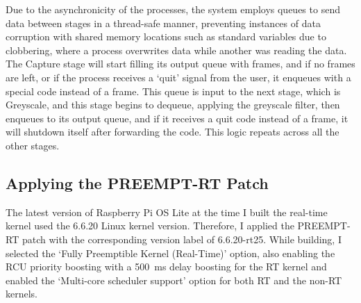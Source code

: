 Due to the asynchronicity of the processes, the system employs queues to send data between stages in a thread-safe manner, preventing instances of data corruption with shared memory locations such as standard variables due to clobbering, where a process overwrites data while another was reading the data. The Capture stage will start filling its output queue with frames, and if no frames are left, or if the process receives a `quit' signal from the user, it enqueues with a special code instead of a frame. This queue is input to the next stage, which is Greyscale, and this stage begins to dequeue, applying the greyscale filter, then enqueues to its output queue, and if it receives a quit code instead of a frame, it will shutdown itself after forwarding the code. This logic repeats across all the other stages.

\subsection{Applying the PREEMPT-RT Patch}

The latest version of Raspberry Pi OS Lite at the time I built the real-time kernel used the 6.6.20 Linux kernel version. Therefore, I applied the PREEMPT-RT patch with the corresponding version label of 6.6.20-rt25. While building, I selected the `Fully Preemptible Kernel (Real-Time)' option, also enabling the RCU priority boosting with a \SI{500}{\milli\second} delay boosting for the RT kernel and enabled the `Multi-core scheduler support' option for both RT and the non-RT kernels.